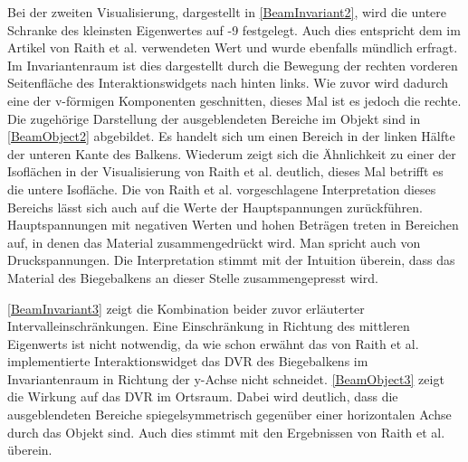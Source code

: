 \documentclass[a4paper,fontsize=12pt,toc=bib,parskip=half,ngerman]{scrartcl}
\begin{document}
Bei der zweiten Visualisierung, dargestellt in \cref{BeamInvariant2}, wird die untere Schranke des kleinsten Eigenwertes auf -9 festgelegt. Auch dies entspricht dem im Artikel von Raith et al. verwendeten Wert und wurde ebenfalls m\"undlich erfragt. Im Invariantenraum ist dies dargestellt durch die Bewegung der rechten vorderen Seitenfl\"ache des Interaktionswidgets nach hinten links. Wie zuvor wird dadurch eine der v-f\"ormigen Komponenten geschnitten, dieses Mal ist es jedoch die rechte. Die zugeh\"orige Darstellung der ausgeblendeten Bereiche im Objekt sind in \cref{BeamObject2} abgebildet. Es handelt sich um einen Bereich in der linken H\"alfte der unteren Kante des Balkens. Wiederum zeigt sich die \"Ahnlichkeit zu einer der Isofl\"achen in der Visualisierung von Raith et al. deutlich, dieses Mal betrifft es die untere Isofl\"ache. Die von Raith et al. vorgeschlagene Interpretation dieses Bereichs l\"asst sich auch auf die Werte der Hauptspannungen zur\"uckf\"uhren. Hauptspannungen mit negativen Werten und hohen Betr\"agen treten in Bereichen auf, in denen das Material zusammengedr\"uckt wird. Man spricht auch von Druckspannungen. Die Interpretation stimmt mit der Intuition \"uberein, dass das Material des Biegebalkens an dieser Stelle zusammengepresst wird.

\cref{BeamInvariant3} zeigt die Kombination beider zuvor erl\"auterter Intervalleinschr\"ankungen. Eine Einschr\"ankung in Richtung des mittleren Eigenwerts ist nicht notwendig, da wie schon erw\"ahnt das von Raith et al. implementierte Interaktionswidget das DVR des Biegebalkens im Invariantenraum in Richtung der y-Achse nicht schneidet. \cref{BeamObject3} zeigt die Wirkung auf das DVR im Ortsraum. Dabei wird deutlich, dass die ausgeblendeten Bereiche spiegelsymmetrisch gegen\"uber einer horizontalen Achse durch das Objekt sind. Auch dies stimmt mit den Ergebnissen von Raith et al. \"uberein.
\end{document}
